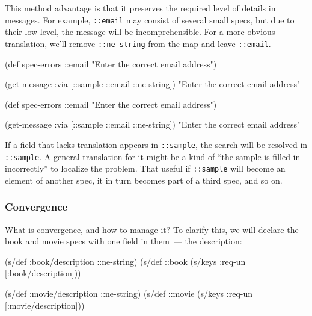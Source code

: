 This method advantage is that it preserves the required level of details in messages. For example, \verb|::email| may consist of several small specs, but due to their low level, the message will be incomprehensible. For a more obvious translation, we'll remove \verb|::ne-string| from the map and leave \verb|::email|.

\ifx\DEVICETYPE\MOBILE

  \begin{clojure}
(def spec-errors
  {::email
   "Enter the correct email address"})

(get-message
  {:via [::sample ::email ::ne-string]})
"Enter the correct email address"
  \end{clojure}

\else

  \begin{clojure}
(def spec-errors
  {::email "Enter the correct email address"})

(get-message {:via [::sample ::email ::ne-string]})
"Enter the correct email address"
  \end{clojure}

\fi

If a field that lacks translation appears in \verb|::sample|, the search will be resolved in \verb|::sample|. A general translation for it might be a kind of ``the sample is filled in incorrectly'' to localize the problem. That useful if \verb|::sample| will become an element of another spec, it in turn becomes part of a third spec, and so on.

\subsubsection{Convergence}

What is convergence, and how to manage it? To clarify this, we will declare the book and movie specs with one field in them~--- the description:

\ifx\DEVICETYPE\MOBILE

\begin{english}
  \begin{clojure}
(s/def :book/description ::ne-string)
(s/def ::book
  (s/keys :req-un [:book/description]))

(s/def :movie/description ::ne-string)
(s/def ::movie
  (s/keys :req-un [:movie/description]))
  \end{clojure}
\end{english}

